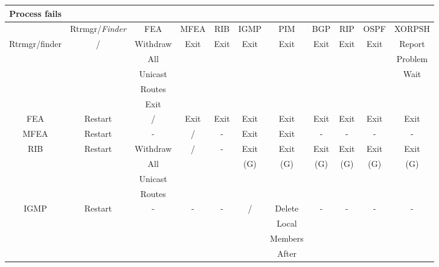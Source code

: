\documentclass[11pt]{article}
\makeatletter
\newcommand{\finder} {{\em Finder}\@\xspace}
\makeatother
\begin{document}
\begin{table}[ht]
\begin{center}
\begin{tabular}{|c|c|c|c|c|c|c|c|c|c|c|}
\hline
Process fails &                &          &      &      &      &         &      &      &      &        \\\hline
              & Rtrmgr/\finder & FEA      & MFEA & RIB  & IGMP & PIM     & BGP  & RIP  & OSPF & XORPSH \\\hline
Rtrmgr/finder & /              & Withdraw & Exit & Exit & Exit & Exit    & Exit & Exit & Exit & Report \\
              &                & All      &      &      &      &         &      &      &      & Problem\\
              &                & Unicast  &      &      &      &         &      &      &      & Wait   \\
              &                & Routes   &      &      &      &         &      &      &      &        \\
              &                & Exit     &      &      &      &         &      &      &      &        \\\hline
FEA           &  Restart       & /        & Exit & Exit & Exit & Exit    & Exit & Exit & Exit & Exit   \\\hline
MFEA          &  Restart       & -        & /    & -    & Exit & Exit    & -    & -    & -    & -      \\\hline
RIB           &  Restart       & Withdraw & /    & -    & Exit & Exit    & Exit & Exit & Exit & Exit   \\
              &                & All      &      &      & (G)  & (G)     & (G)  & (G)  & (G)  & (G)    \\
              &                & Unicast  &      &      &      &         &      &      &      &        \\
              &                & Routes   &      &      &      &         &      &      &      &        \\\hline
IGMP          &  Restart       & -        & -    & -    & /    & Delete  & -    & -    & -    & -      \\
              &                &          &      &      &      & Local   &      &      &      &        \\
              &                &          &      &      &      & Members &      &      &      &        \\
              &                &          &      &      &      & After   &      &      &      &        \\

\end{tabular}
\end{center}
\end{table}
\end{document}
